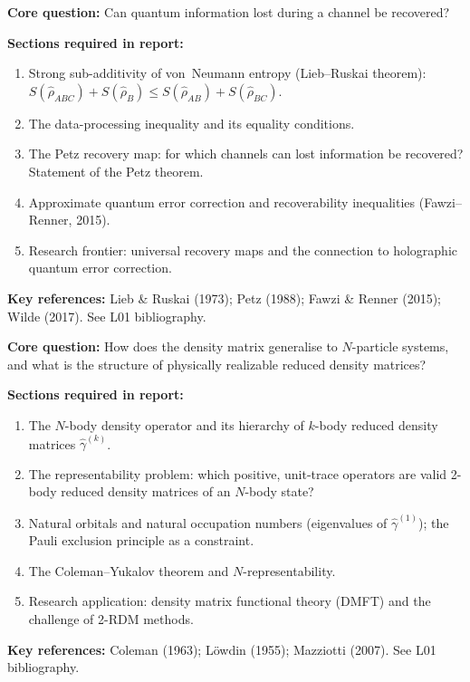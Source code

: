\documentclass[11pt,a4paper]{article}
\begin{document}
\begin{tcolorbox}[gradprobbox, title={Project CG3 --- Quantum Entropy Inequalities and the Petz Recovery Map}]
\textbf{Core question:} Can quantum information lost during a channel be recovered?

\medskip\textbf{Sections required in report:}
\begin{enumerate}[leftmargin=1.8em, label=\textbf{\arabic*.}, itemsep=6pt]
  \item Strong sub-additivity of von~Neumann entropy (Lieb--Ruskai theorem):
        $S(\hat{\rho}_{ABC})+S(\hat{\rho}_B)\le S(\hat{\rho}_{AB})+S(\hat{\rho}_{BC})$.
  \item The data-processing inequality and its equality conditions.
  \item The Petz recovery map: for which channels can lost information be recovered?
        Statement of the Petz theorem.
  \item Approximate quantum error correction and recoverability inequalities
        (Fawzi--Renner, 2015).
  \item Research frontier: universal recovery maps and the connection to
        holographic quantum error correction.
\end{enumerate}

\medskip\textbf{Key references:} Lieb \& Ruskai (1973); Petz (1988);
Fawzi \& Renner (2015); Wilde (2017). See L01 bibliography.
\end{tcolorbox}

\bigskip

\begin{tcolorbox}[gradprobbox, title={Project CG4 --- Many-Body Density Matrices and Reduced Density Matrices}]
\textbf{Core question:} How does the density matrix generalise to $N$-particle systems,
and what is the structure of physically realizable reduced density matrices?

\medskip\textbf{Sections required in report:}
\begin{enumerate}[leftmargin=1.8em, label=\textbf{\arabic*.}, itemsep=6pt]
  \item The $N$-body density operator and its hierarchy of $k$-body reduced density
        matrices $\hat{\gamma}^{(k)}$.
  \item The representability problem: which positive, unit-trace operators are
        valid 2-body reduced density matrices of an $N$-body state?
  \item Natural orbitals and natural occupation numbers (eigenvalues of
        $\hat{\gamma}^{(1)}$); the Pauli exclusion principle as a constraint.
  \item The Coleman--Yukalov theorem and $N$-representability.
  \item Research application: density matrix functional theory (DMFT) and
        the challenge of 2-RDM methods.
\end{enumerate}

\medskip\textbf{Key references:} Coleman (1963); Löwdin (1955);
Mazziotti (2007). See L01 bibliography.
\end{tcolorbox}
\end{document}
